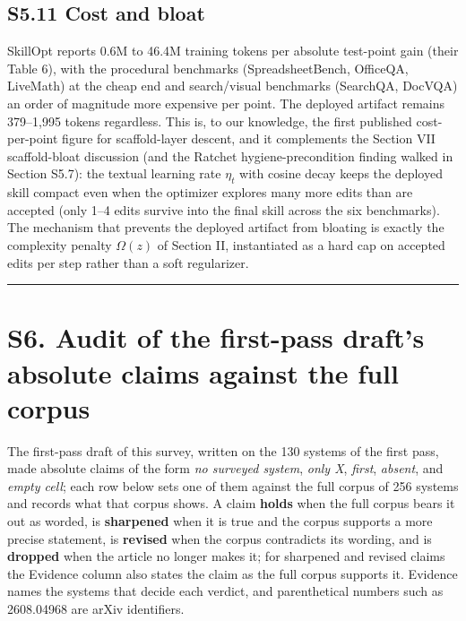 \documentclass[
]{article}
\begin{document}
\subsection{S5.11 Cost and bloat}\label{s5.11-cost-and-bloat}

SkillOpt reports 0.6M to 46.4M training tokens per absolute test-point
gain (their Table 6), with the procedural benchmarks (SpreadsheetBench,
OfficeQA, LiveMath) at the cheap end and search/visual benchmarks
(SearchQA, DocVQA) an order of magnitude more expensive per point. The
deployed artifact remains 379--1,995 tokens regardless. This is, to our
knowledge, the first published cost-per-point figure for scaffold-layer
descent, and it complements the Section VII scaffold-bloat discussion
(and the Ratchet hygiene-precondition finding walked in Section S5.7):
the textual learning rate \(\eta_t\) with cosine decay keeps the
deployed skill compact even when the optimizer explores many more edits
than are accepted (only 1--4 edits survive into the final skill across
the six benchmarks). The mechanism that prevents the deployed artifact
from bloating is exactly the complexity penalty \(\Omega(z)\) of Section
II, instantiated as a hard cap on accepted edits per step rather than a
soft regularizer.

\begin{center}\rule{0.5\linewidth}{0.5pt}\end{center}

\section{S6. Audit of the first-pass draft's absolute claims against the
full
corpus}\label{s6.-audit-of-the-first-pass-drafts-absolute-claims-against-the-full-corpus}

The first-pass draft of this survey, written on the 130 systems of the
first pass, made absolute claims of the form \emph{no surveyed system},
\emph{only X}, \emph{first}, \emph{absent}, and \emph{empty cell}; each
row below sets one of them against the full corpus of 256 systems and
records what that corpus shows. A claim \textbf{holds} when the full
corpus bears it out as worded, is \textbf{sharpened} when it is true and
the corpus supports a more precise statement, is \textbf{revised} when
the corpus contradicts its wording, and is \textbf{dropped} when the
article no longer makes it; for sharpened and revised claims the
Evidence column also states the claim as the full corpus supports it.
Evidence names the systems that decide each verdict, and parenthetical
numbers such as 2608.04968 are arXiv identifiers.
\end{document}
